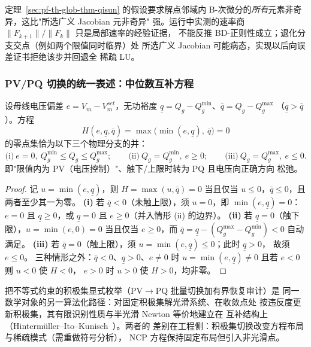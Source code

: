 \begin{remark}[BD-正则性不可由单点证书替代]\label{sec:pf-th-glob-rem-bd}
定理~\ref{sec:pf-th-glob-thm-qisun} 的假设要求解点邻域内
B-次微分的\emph{所有}元素非奇异，这比"所选广义 Jacobian 元非奇异"
强。运行中实测的速率商
$\lVert F_{k+1}\rVert/\lVert F_k\rVert$ 只是局部速率的经验证据，
不能反推 BD-正则性成立；退化分支交点（例如两个限值同时临界）处
所选广义 Jacobian 可能病态，实现以后向误差证书拒绝该步并回退全
稀疏 LU。
\end{remark}

\subsubsection{PV/PQ 切换的统一表述：中位数互补方程}

\begin{proposition}\label{sec:pf-th-glob-prop-median}
设母线电压偏差 $e=V_m-V_m^{set}$，无功裕度
$\underline q=Q_g-Q_g^{\min}$、$\bar q=Q_g-Q_g^{\max}$
（$\underline q>\bar q$）。方程
\begin{equation}
H(e,\underline q,\bar q)
=\max\bigl(\min(e,\underline q),\ \bar q\bigr)=0
\end{equation}
的零点集恰为以下三个物理分支的并：
\begin{equation}
\text{(i)}\ e=0,\ Q_g^{\min}\le Q_g\le Q_g^{\max};\qquad
\text{(ii)}\ Q_g=Q_g^{\min},\ e\ge0;\qquad
\text{(iii)}\ Q_g=Q_g^{\max},\ e\le0 .
\end{equation}
即"限值内为 PV（电压控制）"、触下/上限时转为 PQ 且电压向正确方向
松弛。
\end{proposition}

\begin{proof}
记 $u=\min(e,\underline q)$，则 $H=\max(u,\bar q)=0$ 当且仅当
$u\le0$，$\bar q\le0$，且两者至少其一为零。
\textbf{(i)} 若 $\bar q<0$（未触上限），须 $u=0$，即
$\min(e,\underline q)=0$：$e=0$ 且 $\underline q\ge0$，或
$\underline q=0$ 且 $e\ge0$（并入情形 (ii) 的边界）。
\textbf{(ii)} 若 $\underline q=0$（触下限），$u=\min(e,0)=0$
当且仅当 $e\ge0$，而 $\bar q=\underline q-(Q_g^{\max}-Q_g^{\min})<0$
自动满足。
\textbf{(iii)} 若 $\bar q=0$（触上限），须
$u=\min(e,\underline q)\le0$；此时 $\underline q>0$，
故须 $e\le0$。
三种情形之外：$\bar q<0$、$\underline q>0$、$e\ne0$ 时
$u=\min(e,\underline q)\ne0$ 且若 $e<0$ 则 $u<0$ 使 $H<0$，
$e>0$ 时 $u>0$ 使 $H>0$，均非零。
\end{proof}

\begin{remark}\label{sec:pf-th-glob-rem-activeset}
把不等式约束的积极集显式枚举（PV$\to$PQ 批量切换加有界恢复审计）是
同一数学对象的另一算法化路径：对固定积极集解光滑系统、在收敛点处
按违反度更新积极集，其有限识别性质与半光滑 Newton 等价地建立在
互补结构上（Hintermüller--Ito--Kunisch~\cite{pfglob-hik}）。两者的
差别在工程侧：积极集切换改变方程布局与稀疏模式（需重做符号分析），
NCP 方程保持固定布局但引入非光滑点。
\end{remark}

